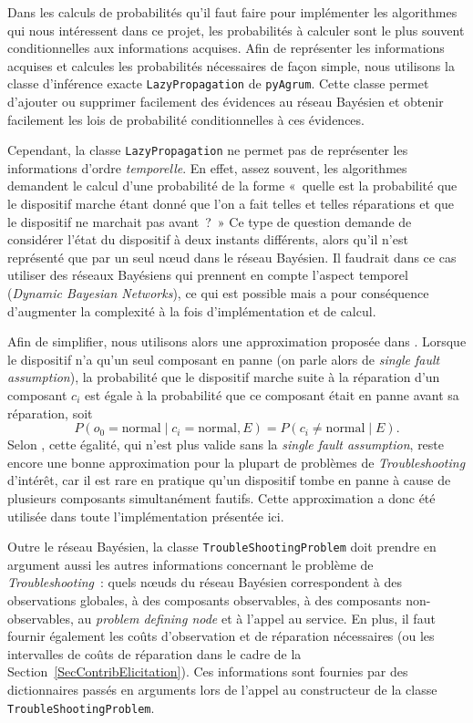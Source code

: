\documentclass[a4paper,11pt]{article}
\theoremstyle{plain}
\theoremstyle{definition}
\begin{document}
Dans les calculs de probabilités qu'il faut faire pour implémenter les algorithmes qui nous intéressent dans ce projet, les probabilités à calculer sont le plus souvent conditionnelles aux informations acquises. Afin de représenter les informations acquises et calcules les probabilités nécessaires de façon simple, nous utilisons la classe d'inférence exacte \texttt{LazyPropagation} de \texttt{pyAgrum}. Cette classe permet d'ajouter ou supprimer facilement des évidences au réseau Bayésien et obtenir facilement les lois de probabilité conditionnelles à ces évidences.

Cependant, la classe \texttt{LazyPropagation} ne permet pas de représenter les informations d'ordre \emph{temporelle}. En effet, assez souvent, les algorithmes demandent le calcul d'une probabilité de la forme «~quelle est la probabilité que le dispositif marche étant donné que l'on a fait telles et telles réparations et que le dispositif ne marchait pas avant~?~» Ce type de question demande de considérer l'état du dispositif à deux instants différents, alors qu'il n'est représenté que par un seul nœud dans le réseau Bayésien. Il faudrait dans ce cas utiliser des réseaux Bayésiens qui prennent en compte l'aspect temporel (\emph{Dynamic Bayesian Networks}), ce qui est possible mais a pour conséquence d'augmenter la complexité à la fois d'implémentation et de calcul.

Afin de simplifier, nous utilisons alors une approximation proposée dans \cite{Heckerman_1995, heckerman1994troubleshooting}. Lorsque le dispositif n'a qu'un seul composant en panne (on parle alors de \emph{single fault assumption}), la probabilité que le dispositif marche suite à la réparation d'un composant $c_i$ est égale à la probabilité que ce composant était en panne avant sa réparation, soit
\[
P(o_0 = \text{normal} \mid c_i = \text{normal}, E) = P(c_i \neq \text{normal} \mid E).
\]
Selon \cite{Heckerman_1995, heckerman1994troubleshooting}, cette égalité, qui n'est plus valide sans la \emph{single fault assumption}, reste encore une bonne approximation pour la plupart de problèmes de \emph{Troubleshooting} d'intérêt, car il est rare en pratique qu'un dispositif tombe en panne à cause de plusieurs composants simultanément fautifs. Cette approximation a donc été utilisée dans toute l'implémentation présentée ici.

Outre le réseau Bayésien, la classe \texttt{TroubleShootingProblem} doit prendre en argument aussi les autres informations concernant le problème de \emph{Troubleshooting}~: quels nœuds du réseau Bayésien correspondent à des observations globales, à des composants observables, à des composants non-observables, au \emph{problem defining node} et à l'appel au service. En plus, il faut fournir également les coûts d'observation et de réparation nécessaires (ou les intervalles de coûts de réparation dans le cadre de la Section~\ref{SecContribElicitation}). Ces informations sont fournies par des dictionnaires passés en arguments lors de l'appel au constructeur de la classe \texttt{TroubleShootingProblem}.
\end{document}
